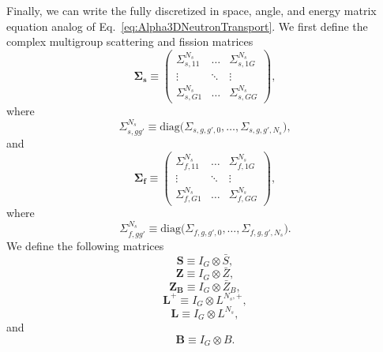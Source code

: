 Finally, we can write the fully discretized in space, angle, and energy matrix equation analog of Eq.~\ref{eq:Alpha3DNeutronTransport}. We first define the complex multigroup scattering and fission matrices
\begin{equation}
	\mathbf{\Sigma_{s}} \equiv \begin{pmatrix}
							\Sigma_{s,11}^{N_{s}} & \dots & \Sigma_{s,1G}^{N_{s}} \\
							\vdots & \ddots & \vdots \\
							\Sigma_{s,G1}^{N_{s}} & \dots & \Sigma_{s,GG}^{N_{s}}
						\end{pmatrix},
\end{equation}
where
\begin{equation}
	\Sigma_{s,gg'}^{N_{s}} \equiv \text{diag} \big (\Sigma_{s,g,g',0}, \dots, \Sigma_{s,g,g',N_{s}} \big ),
\end{equation}
and
\begin{equation}
	\mathbf{\Sigma_{f}} \equiv \begin{pmatrix}
							\Sigma_{f,11}^{N_{s}} & \dots & \Sigma_{f,1G}^{N_{s}} \\
							\vdots & \ddots & \vdots \\
							\Sigma_{f,G1}^{N_{s}} & \dots & \Sigma_{f,GG}^{N_{s}}
						\end{pmatrix},
\end{equation}
where
\begin{equation}
	\Sigma_{f,gg'}^{N_{s}} \equiv \text{diag} \big (\Sigma_{f,g,g',0}, \dots, \Sigma_{f,g,g',N_{s}} \big ).
\end{equation}
We define the following matrices
\begin{equation}
	\mathbf{S} \equiv I_{G} \otimes \bar{S},
\end{equation}
\begin{equation}
	\mathbf{Z} \equiv I_{G} \otimes \bar{Z},
\end{equation}
\begin{equation}
	\mathbf{Z_{B}} \equiv I_{G} \otimes \bar{Z}_{B},
\end{equation}
\begin{equation}
	\mathbf{L^{+}} \equiv I_{G} \otimes L^{N_{s},+},
\end{equation}
\begin{equation}
	\mathbf{L} \equiv I_{G} \otimes L^{N_{s}},
\end{equation}
and
\begin{equation}
	\mathbf{B} \equiv I_{G} \otimes B.
\end{equation}
